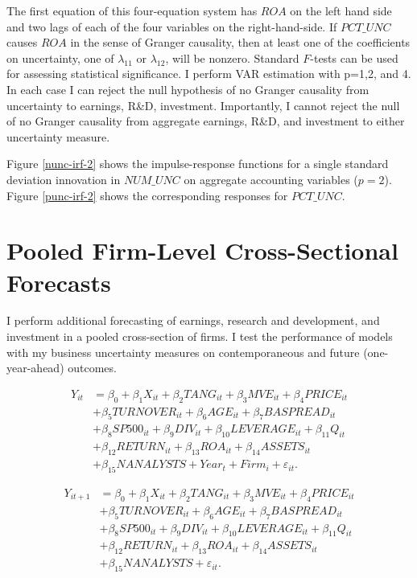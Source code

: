 \documentclass[12pt, letterpaper]{article}
\begin{document}
The first equation of this four-equation system has $ROA$ on the left hand side and two lags of each of the four variables on the right-hand-side. If $PCT\_UNC$ causes $ROA$ in the sense of Granger causality, then at least one of the coefficients on uncertainty, one of $\lambda_{11}$ or $\lambda_{12}$, will be nonzero. Standard $F$-tests can be used for assessing statistical significance.
I perform VAR estimation with p=1,2, and 4. In each case I can reject the null hypothesis of no Granger causality from uncertainty to earnings, R\&D, investment. Importantly, I cannot reject the null of no Granger causality from aggregate earnings, R\&D, and investment to either uncertainty measure.

Figure \ref{nunc-irf-2} shows the impulse-response functions for a single standard deviation innovation in $NUM\_UNC$ on aggregate accounting variables ($p=2$). Figure \ref{punc-irf-2} shows the corresponding responses for $PCT\_UNC$.

\section{Pooled Firm-Level Cross-Sectional Forecasts} 
I perform additional forecasting of earnings, research and development, and investment in a pooled cross-section of firms. I test the performance of models with my business uncertainty measures on contemporaneous and future (one-year-ahead) outcomes.

\begin{equation} \label{eq:xs-contemp} 
\begin{aligned} 
Y_{it} &=
\beta_{0} + \beta_{1}X_{it} + \beta_{2}TANG_{it} + \beta_{3}MVE_{it} + \beta_{4}PRICE_{it} \\ & +
\beta_{5}TURNOVER_{it} + \beta_{6}AGE_{it} + \beta_{7}BASPREAD_{it} \\ &+ \beta_{8}SP500_{it} +
\beta_{9}DIV_{it} + \beta_{10}LEVERAGE_{it} + \beta_{11}Q_{it} \\ &+ \beta_{12}RETURN_{it} +
\beta_{13}ROA_{it} + \beta_{14}ASSETS_{it} \\ &+ \beta_{15}NANALYSTS + Year_{t} + Firm_{i} + \varepsilon_{it}. 
\end{aligned}
\end{equation}

\begin{equation} \label{eq:xs-future} 
\begin{aligned} 
Y_{it+1} &=
\beta_{0} + \beta_{1}X_{it} + \beta_{2}TANG_{it} + \beta_{3}MVE_{it} + \beta_{4}PRICE_{it} \\ & +
\beta_{5}TURNOVER_{it} + \beta_{6}AGE_{it} + \beta_{7}BASPREAD_{it} \\ &+ \beta_{8}SP500_{it} +
\beta_{9}DIV_{it} + \beta_{10}LEVERAGE_{it} + \beta_{11}Q_{it} \\ &+ \beta_{12}RETURN_{it} +
\beta_{13}ROA_{it} + \beta_{14}ASSETS_{it} \\ &+ \beta_{15}NANALYSTS + \varepsilon_{it}. 
\end{aligned}
\end{equation}
\end{document}
